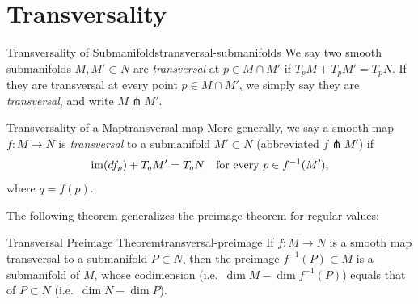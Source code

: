 
\section{Transversality}

\begin{definition}{Transversality of Submanifolds}{transversal-submanifolds}
    We say two smooth submanifolds $M, M' \subset N$ are \emph{transversal} at $p \in M \cap M'$ if $T_p M + T_p M' = T_p N$. If they are transversal at every point $p \in M \cap M'$, we simply say they are \emph{transversal}, and write $M \pitchfork M'$.
\end{definition}

\begin{definition}{Transversality of a Map}{transversal-map}
    More generally, we say a smooth map $f \colon M \to N$ is \emph{transversal} to a submanifold $M' \subset N$ (abbreviated $f \pitchfork M'$) if
    \[
        \operatorname{im}(df_p) + T_q M' = T_q N \quad \text{for every } p \in f^{-1}(M'),
    \]
    where $q = f(p)$.
\end{definition}

\begin{center}
\end{center}

The following theorem generalizes the preimage theorem for regular values:

\begin{theorem}{Transversal Preimage Theorem}{transversal-preimage}
    If $f \colon M \to N$ is a smooth map transversal to a submanifold $P \subset N$, then the preimage $f^{-1}(P) \subset M$ is a submanifold of $M$, whose codimension (i.e.\ $\dim M - \dim f^{-1}(P)$) equals that of $P \subset N$ (i.e.\ $\dim N - \dim P$).
\end{theorem}

